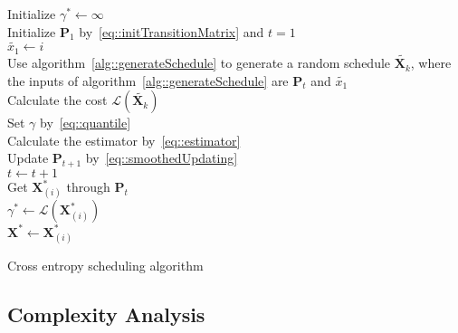 \begin{algorithm}[]
 \SetAlgoLined
 \BlankLine
 Initialize $\gamma^* \gets \infty$ \\
 {
 	Initialize ${\mathbf{P}_1}$ by~\eqref{eq::initTransitionMatrix} and $t=1$\\
 	$\tilde{x_1} \gets i$\\
 	{
 		{
 		Use algorithm~\ref{alg::generateSchedule} to generate a random schedule $\tilde{\mathbf{X}_k}$, where the inputs of algorithm~\ref{alg::generateSchedule} are $\mathbf{P}_t$ and $\tilde{x_1}$ \\
 		Calculate the cost $\mathcal{L}(\tilde{\mathbf{X}_k})$ \\
  		}
  		Set $\gamma$ by~\eqref{eq::quantile} \\
  		Calculate the estimator by~\eqref{eq::estimator} \\
  		Update $\mathbf{P}_{t+1}$ by~\eqref{eq::smoothedUpdating} \\
  		$t \gets t+1$ \\
 	}
 	Get $\mathbf{X}^*_{(i)}$ through $\mathbf{P}_t$ \\
 	{
 		$\gamma^* \gets \mathcal{L}(\mathbf{X}^*_{(i)})$ \\
 		$\mathbf{X}^* \gets \mathbf{X}^*_{(i)}$ \\
 	}
 }
 \caption{\label{alg::CE}Cross entropy scheduling algorithm}
\end{algorithm}
\DecMargin{1em}
%
\subsection{Complexity Analysis}